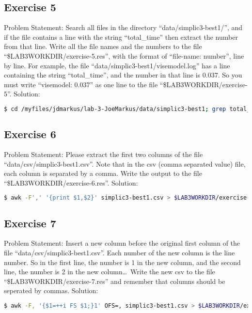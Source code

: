 \documentclass{article}
\begin{document}
\subsection{Exercise 5}
\large{Problem Statement: }\normalsize Search all files in the directory ``data/simplic3-best1/'', and if the file contains a line with the string ``total\_time'' then extract the number from that line.
Write all the file names and the numbers to the file ``\$LAB3WORKDIR/exercise-5.res'', with
the format of ``file-name: number'', line by line.
For example, the file ``data/simplic3-best1/visemodel.log'' has a line containing the string
``total\_time'', and the number in that line is 0.037. So you must write ``visemodel: 0.037'' as
one line to the file ``\$LAB3WORKDIR/exercise-5''.
\newline\newline
\large{Solution: }\normalsize 
\begin{lstlisting}[language=bash]
$ cd /myfiles/jdmarkus/lab-3-JoeMarkus/data/simplic3-best1; grep total_time * | sed 's/total_time = / /' | sed 's/.log//' > /myfiles/jdmarkus/lab-3-JoeMarkus/exercise-5.res
\end{lstlisting}

\subsection{Exercise 6}
\large{Problem Statement: }\normalsize Please extract the first two columns of the file ``data/csv/simplic3-best1.csv''. Note that in
the csv (comma separated value) file, each column is separated by a comma. Write the
output to the file ``\$LAB3WORKDIR/exercise-6.res''.
\newline\newline
\large{Solution: }\normalsize 
\begin{lstlisting}[language=bash]
$ awk -F',' '{print $1,$2}' simplic3-best1.csv > $LAB3WORKDIR/exercise-6.res
\end{lstlisting}

\subsection{Exercise 7}
\large{Problem Statement: }\normalsize Insert a new column before the original first column of the file ``data/csv/simplic3-best1.csv''.
Each number of the new column is the line number. So in the first line, the number is 1
in the new column, and the second line, the number is 2 in the new column\ldots\ Write the
new csv to the file ``\$LAB3WORKDIR/exercise-7.res'' and remember that columns should
be seperated by commas.
\newline\newline
\large{Solution: }\normalsize 
\begin{lstlisting}[language=bash]
$ awk -F, '{$1=++i FS $1;}1' OFS=, simplic3-best1.csv > $LAB3WORKDIR/exercise-7.res
\end{lstlisting}
\end{document}

